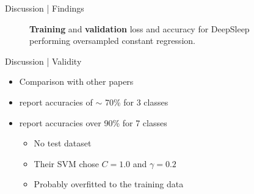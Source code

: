 \documentclass{beamer}
\begin{document}
    \begin{frame}{Discussion | Findings}
        \begin{figure}[!hbt]
        	\caption{\textcolor{viridis9}{\textbf{Training}} and \textcolor{viridis0}{\textbf{validation}} loss and accuracy for DeepSleep performing oversampled constant regression.}
        \end{figure}
    \end{frame}
    
    \begin{frame}{Discussion | Validity}
        \begin{itemize}
            \item Comparison with other papers
            \item \cite{threeclassclassification} report accuracies of $\sim$ 70\% for 3 classes
            \item \cite{patternshrd} report accuracies over 90\% for 7 classes
            \begin{itemize}
                \item No test dataset
                \item Their SVM chose $C = 1.0$ and $\gamma = 0.2$
                \item Probably overfitted to the training data
            \end{itemize}
        \end{itemize}
    \end{frame}
    
\end{document}
